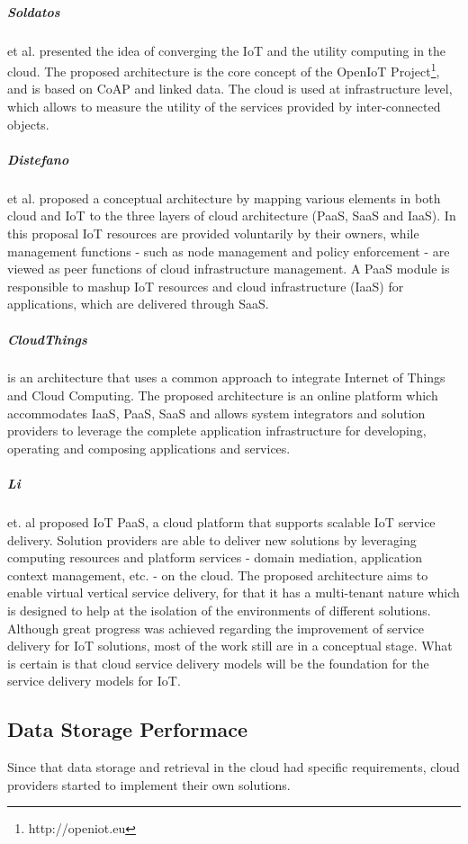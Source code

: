 \subparagraph{Soldatos} et al. \cite{soldatos2012convergence} presented the idea of converging the IoT
and the utility computing in the cloud. The proposed architecture is the core concept of the OpenIoT
Project\footnote{http://openiot.eu}, and is based on CoAP \cite{shelby2014constrained} and linked data.
The cloud is used at infrastructure level, which allows to measure the utility of the services provided
by inter-connected objects.
\subparagraph{Distefano} et al. \cite{distefano2012enabling} proposed a conceptual architecture by
mapping various elements in both cloud and IoT to the three layers of cloud architecture (\gls{PaaS},
\gls{SaaS} and \gls{IaaS}). In this proposal IoT resources are provided voluntarily by their owners,
while management functions - such as node management and policy enforcement - are viewed as peer
functions of cloud infrastructure management. A \gls{PaaS} module is responsible to mashup IoT resources
and cloud infrastructure (\gls{IaaS}) for applications, which are delivered through \gls{SaaS}.
\subparagraph{CloudThings} \cite{zhou2013cloudthings} is an architecture that uses a common
approach to integrate Internet of Things and Cloud Computing. The proposed architecture is an online
platform which accommodates \gls{IaaS}, \gls{PaaS}, \gls{SaaS} and allows system integrators and
solution providers to leverage the complete application infrastructure for developing, operating
and composing applications and services.
\subparagraph{Li} et. al \cite{li2013efficient} proposed IoT PaaS, a cloud platform that supports
scalable IoT service delivery. Solution providers are able to deliver new solutions by leveraging
computing resources and platform services - domain mediation, application context management, etc.
- on the cloud. The proposed architecture aims to enable virtual vertical service delivery, for that
it has a multi-tenant nature which is designed to help at the isolation of the environments of
different solutions.\\

Although great progress was achieved regarding the improvement of service delivery for \gls{IoT}
solutions, most of the work still are in a conceptual stage. What is certain is that cloud service
delivery models will be the foundation for the service delivery models for \gls{IoT}.

\subsection{Data Storage Performace}
\label{sub:data_storage}
Since that data storage and retrieval in the cloud had specific requirements, cloud providers started
to implement their own solutions.

